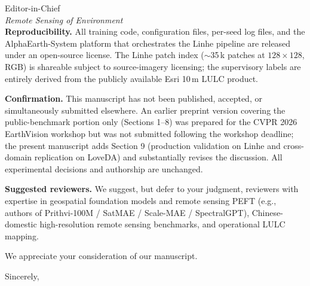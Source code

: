 \documentclass[11pt]{letter}
\begin{document}
\begin{letter}{%
  Editor-in-Chief \\
  \emph{Remote Sensing of Environment} \\
}
\textbf{Reproducibility.} All training code, configuration files, per-seed log files, and the AlphaEarth-System platform that orchestrates the Linhe pipeline are released under an open-source license. The Linhe patch index ($\sim$35\,k patches at $128\times128$, RGB) is shareable subject to source-imagery licensing; the supervisory labels are entirely derived from the publicly available Esri 10\,m LULC product.

\textbf{Confirmation.} This manuscript has not been published, accepted, or simultaneously submitted elsewhere. An earlier preprint version covering the public-benchmark portion only (Sections 1--8) was prepared for the CVPR 2026 EarthVision workshop but was not submitted following the workshop deadline; the present manuscript adds Section 9 (production validation on Linhe and cross-domain replication on LoveDA) and substantially revises the discussion. All experimental decisions and authorship are unchanged.

\textbf{Suggested reviewers.} We suggest, but defer to your judgment, reviewers with expertise in geospatial foundation models and remote sensing PEFT (e.g., authors of Prithvi-100M / SatMAE / Scale-MAE / SpectralGPT), Chinese-domestic high-resolution remote sensing benchmarks, and operational LULC mapping.

We appreciate your consideration of our manuscript.

\closing{Sincerely,}

\end{letter}
\end{document}
